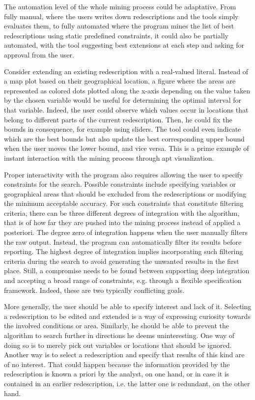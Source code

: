 The automation level of the whole mining process could be adaptative.
From fully manual, where the users writes down redescriptions and the
tools simply evaluates them, to fully automated where the program
mines the list of best redescriptions using static predefined
constraints, it could also be partially automated, with the tool
suggesting best extensions at each step and asking for approval from
the user.

Consider extending an existing redescription with a real-valued
literal. Instead of a map plot based on their geographical location, a
figure where the areas are represented as colored dots plotted along
the x-axis depending on the value taken by the chosen variable would be
useful for determining the optimal interval for that variable. Indeed,
the user could observe which values occur in locations that belong to
different parts of the current redescription. Then, he could fix the
bounds in consequence, for example using sliders.  The tool could even
indicate which are the best bounds but also update the best
corresponding upper bound when the user moves the lower bound, and
vice versa. This is a prime example of instant interaction with the
mining process through apt visualization.  

Proper interactivity with the program also requires allowing the user
to specify constraints for the search. Possible constraints include
specifying variables or geographical areas that should be excluded
from the redescriptions or modifying the minimum acceptable accuracy.
For such constraints that constitute filtering criteria, there can be
three different degrees of integration with the algorithm, that is of
how far they are pushed into the mining process instead of applied a
posteriori.  The degree zero of integration happens when the user
manually filters the raw output. Instead, the program can
automatically filter its results before reporting. The highest degree
of integration implies incorporating such filtering criteria during
the search to avoid generating the unwanted results in the first
place.  Still, a compromise needs to be found between supporting
deep integration and accepting a broad range of constraints,
e.g. through a flexible specification framework. Indeed, these are two
 typically conflicting goals.

 More generally, the user should be able to specify interest and
 lack of it. Selecting a redescription to be
 edited and extended is a way of expressing curiosity towards the
 involved conditions or area. Similarly, he should be able to prevent
 the algorithm to search further in directions he deems uninteresting.
 One way of doing so is to merely pick out variables or locations that should be
 ignored.  Another way is to select a redescription and specify that
 results of this kind are of no interest. That could happen because the
 information provided by the redescription is known a priori by the
 analyst, on one hand, or in case it is contained in an earlier
 redescription, i.e. the latter one is redundant, on the other hand.

